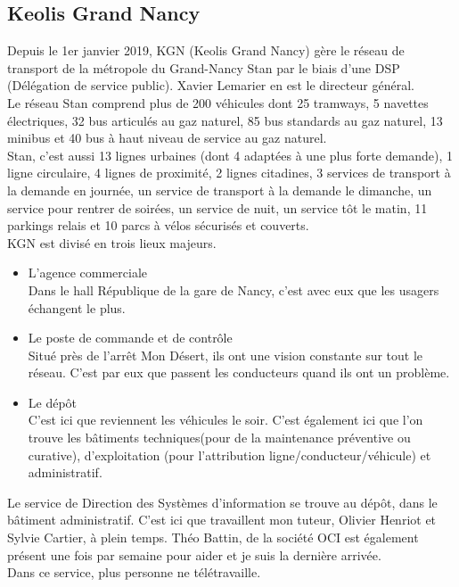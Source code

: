 \documentclass{article}
\begin{document}
    \subsection{Keolis Grand Nancy}
        Depuis le 1er janvier 2019, KGN (Keolis Grand Nancy) gère le réseau de
        transport de la métropole du Grand-Nancy Stan par le biais d'une DSP (Délégation de service public). Xavier Lemarier en est 
        le directeur général.\\
        Le réseau Stan comprend plus de 200 véhicules dont 25 tramways, 5
        navettes électriques, 32 bus articulés au gaz naturel, 85 bus standards
        au gaz naturel, 13 minibus et 40 bus à haut niveau de service au gaz
        naturel. \\
        Stan, c'est aussi 13 lignes urbaines (dont 4 adaptées à une plus forte demande), 
        1 ligne circulaire, 4 lignes de proximité, 2 lignes citadines, 3 services de 
        transport à la demande en journée, un service de transport à la demande le dimanche, 
        un service pour rentrer de soirées, un service de nuit, un service tôt 
        le matin, 11 parkings relais et 10 parcs à vélos sécurisés et couverts.\\
        KGN est divisé en trois lieux majeurs. 
        \begin{itemize}
            \item L'agence commerciale\\ 
            Dans le hall République de la gare de Nancy, c'est avec eux que les 
            usagers échangent le plus.
            \item Le poste de commande et de contrôle\\
            Situé près de l'arrêt Mon Désert, ils ont une vision constante sur 
            tout le réseau. C'est par eux que passent les conducteurs quand ils 
            ont un problème. 
            \item Le dépôt\\
            C'est ici que reviennent les véhicules le soir. C'est également 
            ici que l'on trouve les bâtiments techniques(pour de la maintenance 
            préventive ou curative), d'exploitation (pour l'attribution 
            ligne/conducteur/véhicule) et administratif.
        \end{itemize}
        \bigbreak
        Le service de Direction des Systèmes d'information se trouve au dépôt, 
        dans le bâtiment administratif. C'est ici que travaillent mon tuteur, Olivier 
        Henriot et Sylvie Cartier, à plein temps. Théo Battin, de 
        la société OCI est également présent une fois par semaine pour 
        aider et je suis la dernière arrivée.\\
        Dans ce service, plus personne ne télétravaille. 
\pagebreak
\end{document}
